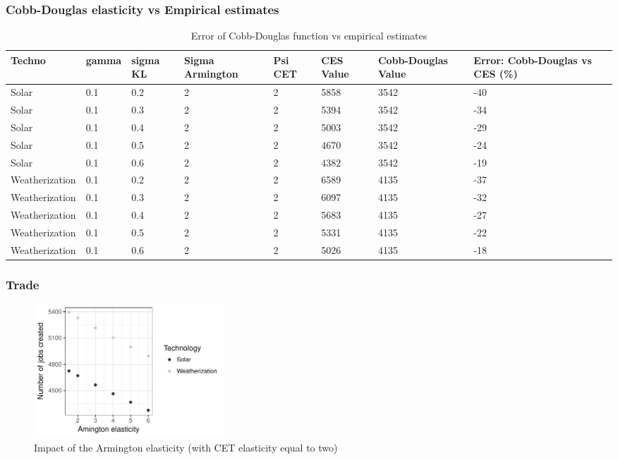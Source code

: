 \subsubsection{Cobb-Douglas elasticity vs Empirical estimates}

\begin{table}
	\centering
	\caption{Error of Cobb-Douglas function vs empirical estimates}
	\label{tab:CobbDouglasError}
	\begin{tabular}{lp{1.5cm}p{1.5cm}p{1.5cm}p{1.5cm}p{1.5cm}p{1.5cm}p{2cm}}
		\toprule
		Techno & gamma & sigma KL & Sigma Armington & Psi CET & CES Value & Cobb-Douglas Value & Error: Cobb-Douglas vs CES (\%)\\
		\midrule 
		Solar & 0.1 & 0.2 & 2 & 2 & 5858 & 3542 & -40 \\
Solar & 0.1 & 0.3 & 2 & 2 & 5394 & 3542 & -34 \\
Solar & 0.1 & 0.4 & 2 & 2 & 5003 & 3542 & -29 \\
Solar & 0.1 & 0.5 & 2 & 2 & 4670 & 3542 & -24 \\
Solar & 0.1 & 0.6 & 2 & 2 & 4382 & 3542 & -19 \\
Weatherization & 0.1 & 0.2 & 2 & 2 & 6589 & 4135 & -37 \\
Weatherization & 0.1 & 0.3 & 2 & 2 & 6097 & 4135 & -32 \\
Weatherization & 0.1 & 0.4 & 2 & 2 & 5683 & 4135 & -27 \\
Weatherization & 0.1 & 0.5 & 2 & 2 & 5331 & 4135 & -22 \\
Weatherization & 0.1 & 0.6 & 2 & 2 & 5026 & 4135 & -18 \\
		\bottomrule
	\end{tabular}
\end{table}



\subsubsection{Trade}

\begin{figure}[!h]
	\centering
	\includegraphics[height=5cm]{figures/Armington.pdf}
	\caption{Impact of the Armington elasticity (with CET elasticity equal to two)}
	\label{fig:armington}
\end{figure}

